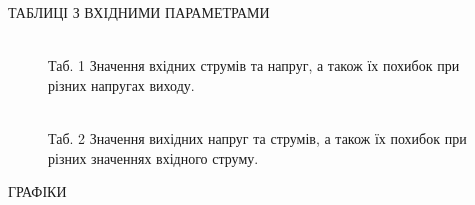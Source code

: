 \documentclass[a4paper,14pt]{extreport}
\begin{document}












\clearpage
\newpage
\begin{center}ТАБЛИЦІ З ВХІДНИМИ ПАРАМЕТРАМИ\\ \end{center}
\vspace{0.5 cm}
\begin{figure}[h]
\\
Таб. 1 Значення вхідних струмів та напруг, а також їх похибок при різних напругах виходу.
\end{figure}


\begin{landscape}
\begin{figure}[h]
\end{figure}

\begin{figure}[h]
\end{figure}

\begin{figure}[h]
\end{figure}

\begin{figure}[h]
\end{figure}

\begin{figure}[h]
\\
Таб. 2 Значення вихідних напруг та струмів, а також їх похибок при різних значеннях вхідного струму.

\end{figure}


\end{landscape}

\newpage
\begin{center}ГРАФІКИ\\ \end{center}
\end{document}

